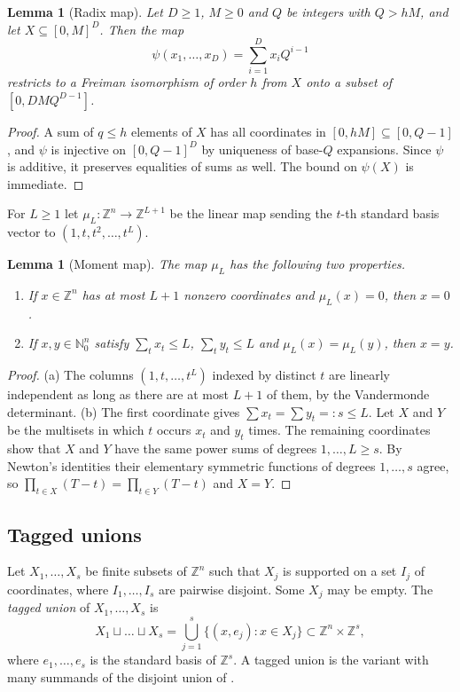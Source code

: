 \documentclass[11pt]{amsart}
\newtheorem{lemma}[theorem]{Lemma}
\theoremstyle{definition}
\theoremstyle{remark}
\numberwithin{equation}{section}
\newcommand{\Z}{\mathbb{Z}}
\newcommand{\N}{\mathbb{N}}
\begin{document}
\begin{lemma}[Radix map]\label{lem:radix}
Let $D\ge 1$, $M\ge 0$ and $Q$ be integers with $Q>hM$, and let $X\subseteq[0,M]^D$. Then the map
\[
\psi(x_1,\dots,x_D)=\sum_{i=1}^Dx_iQ^{i-1}
\]
restricts to a Freiman isomorphism of order $h$ from $X$ onto a subset of $[0,DMQ^{D-1}]$.
\end{lemma}

\begin{proof}
A sum of $q\le h$ elements of $X$ has all coordinates in $[0,hM]\subseteq[0,Q-1]$, and $\psi$ is injective on $[0,Q-1]^D$ by uniqueness of base-$Q$ expansions. Since $\psi$ is additive, it preserves equalities of sums as well. The bound on $\psi(X)$ is immediate.
\end{proof}

For $L\ge 1$ let $\mu_L\colon\Z^n\to\Z^{L+1}$ be the linear map sending the $t$-th standard basis vector to $(1,t,t^2,\dots,t^L)$.

\begin{lemma}[Moment map]\label{lem:moment}
The map $\mu_L$ has the following two properties.
\begin{enumerate}[label=\textup{(\alph*)}]
\item If $x\in\Z^n$ has at most $L+1$ nonzero coordinates and $\mu_L(x)=0$, then $x=0$.
\item If $x,y\in\N_0^n$ satisfy $\sum_tx_t\le L$, $\sum_ty_t\le L$ and $\mu_L(x)=\mu_L(y)$, then $x=y$.
\end{enumerate}
\end{lemma}

\begin{proof}
(a) The columns $(1,t,\dots,t^L)$ indexed by distinct $t$ are linearly independent as long as there are at most $L+1$ of them, by the Vandermonde determinant. (b) The first coordinate gives $\sum x_t=\sum y_t=:s\le L$. Let $X$ and $Y$ be the multisets in which $t$ occurs $x_t$ and $y_t$ times. The remaining coordinates show that $X$ and $Y$ have the same power sums of degrees $1,\dots,L\ge s$. By Newton's identities their elementary symmetric functions of degrees $1,\dots,s$ agree, so $\prod_{t\in X}(T-t)=\prod_{t\in Y}(T-t)$ and $X=Y$.
\end{proof}

\subsection{Tagged unions}
Let $X_1,\dots,X_s$ be finite subsets of $\Z^n$ such that $X_j$ is supported on a set $I_j$ of coordinates, where $I_1,\dots,I_s$ are pairwise disjoint. Some $X_j$ may be empty. The \emph{tagged union} of $X_1,\dots,X_s$ is
\[
X_1\sqcup\dots\sqcup X_s=\bigcup_{j=1}^s\{(x,e_j):x\in X_j\}\subset\Z^n\times\Z^s,
\]
where $e_1,\dots,e_s$ is the standard basis of $\Z^s$. A tagged union is the variant with many summands of the disjoint union of \cite[Definition~4.7]{Raj26}.
\end{document}
